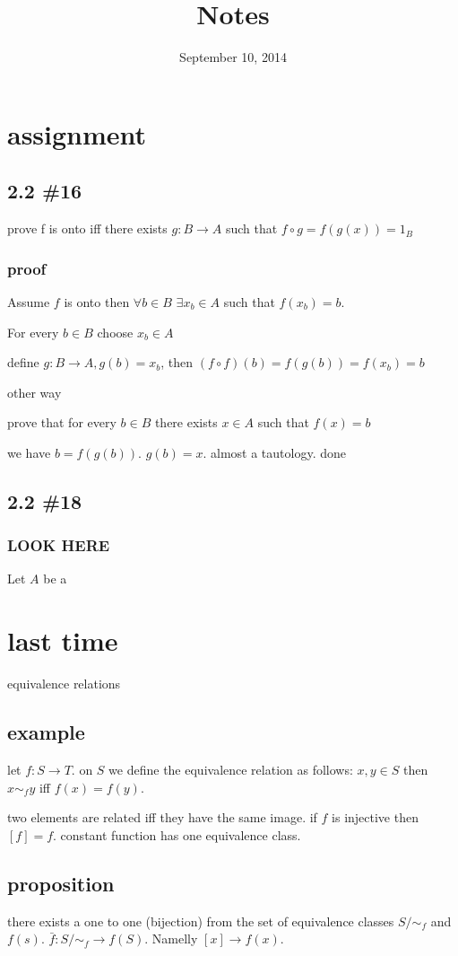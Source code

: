 \documentclass[letterpaper]{article}
\begin{document}
\title{Notes}
\date{September 10, 2014}
\maketitle
\section*{assignment}
\subsection*{2.2 \#16}
prove f is onto iff there exists $g:B\to A$ such that $f\circ g=f(g(x))=1_B$
\subsubsection*{proof}
Assume $f$ is onto then $\forall b\in B$ $\exists x_b\in A$ such  that $f(x_b)=b$.

For every $b\in B$ choose $x_b\in A$

define $g:B\to A, g(b)=x_b$, then $(f\circ f)(b)=f(g(b))=f(x_b)=b$

other way

prove that for every $b\in B$ there exists $x\in A$ such that $f(x)=b$

we have $b=f(g(b))$. $g(b)=x$. almost a tautology. done
\subsection*{2.2 \#18}
\subsubsection*{LOOK HERE}
Let $A$ be a 

\section*{last time}
equivalence relations
\subsection*{example}
let $f:S\to T$. on $S$ we define the equivalence relation as follows: $x,y\in S$ then $x\sim_f y$ iff $f(x)=f(y)$. 

two elements are related iff they have the same image. if $f$ is injective then $[f]=f$. constant function has one equivalence class.

\subsection*{proposition}
there exists a one to one (bijection) from the set of equivalence classes $S/\sim_f$ and $f(s)$. $\bar f:S/\sim_f\to f(S)$. Namelly $[x]\to f(x)$.
\end{document}
